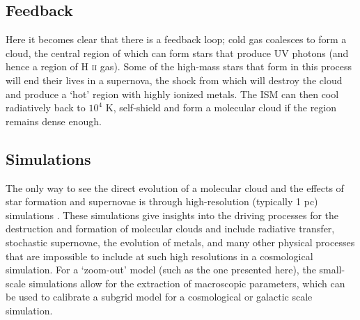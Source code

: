 \subsection{Feedback}

Here it becomes clear that there is a feedback loop; cold gas coalesces to form a cloud, the central region of which can form stars that produce UV photons (and hence a region of H \textsc{ii} gas).
Some of the high-mass stars that form in this process will end their lives in a supernova, the shock from which will destroy the cloud and produce a `hot' region with highly ionized metals.
The ISM can then cool radiatively back to $10^4$ K, self-shield and form a molecular cloud if the region remains dense enough.

\subsection{Simulations} 

The only way to see the direct evolution of a molecular cloud and the effects of star formation and supernovae is through high-resolution (typically 1 pc) simulations \citep{martizzi_supernova_2015, girichidis_silcc_2016}.
These simulations give insights into the driving processes for the destruction and formation of molecular clouds and include radiative transfer, stochastic supernovae, the evolution of metals, and many other physical processes that are impossible to include at such high resolutions in a cosmological simulation.
For a `zoom-out' model (such as the one presented here), the small-scale simulations allow for the extraction of macroscopic parameters, which can be used to calibrate a subgrid model for a cosmological or galactic scale simulation.

\begin{table}[hb]
    \centering
    \caption{Overview of the typical densities of the different phases of gas in the ISM, with $T$ the temperature and $\rho$ the gaseous gas density. Data adapted from \citet{ferriere_interstellar_2001}.}
    \label{tab:ism}
\end{table}
